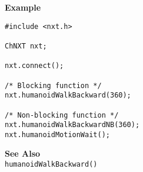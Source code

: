 \noindent
{\bf Example}
\begin{lstlisting}
#include <nxt.h>

ChNXT nxt;

nxt.connect();

/* Blocking function */
nxt.humanoidWalkBackward(360);

/* Non-blocking function */
nxt.humanoidWalkBackwardNB(360);
nxt.humanoidMotionWait();
\end{lstlisting}

\noindent
{\bf See Also}\\
\texttt{humanoidWalkBackward()}

